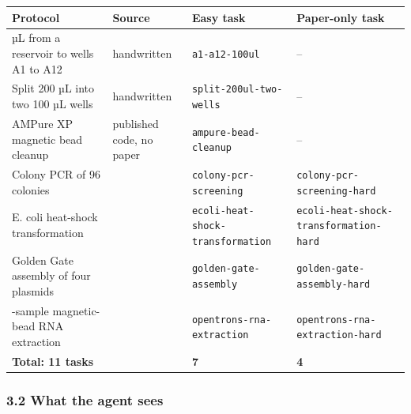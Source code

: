 \documentclass[
]{article}
\newcounter{none} %
\begin{document}
{\def\LTcaptype{none} %
\begin{longtable}[]{@{}
  >{\raggedright\arraybackslash}p{}
  >{\raggedright\arraybackslash}p{}
  >{\raggedright\arraybackslash}p{}
  >{\raggedright\arraybackslash}p{}@{}}
\toprule\noalign{}
\begin{minipage}[b]{\linewidth}\raggedright
Protocol
\end{minipage} & \begin{minipage}[b]{\linewidth}\raggedright
Source
\end{minipage} & \begin{minipage}[b]{\linewidth}\raggedright
Easy task
\end{minipage} & \begin{minipage}[b]{\linewidth}\raggedright
Paper-only task
\end{minipage} \\
\midrule\noalign{}
\endhead
\bottomrule\noalign{}
\endlastfoot
100 µL from a reservoir to wells A1 to A12 & handwritten &
\texttt{a1-a12-100ul} & -- \\
Split 200 µL into two 100 µL wells & handwritten &
\texttt{split-200ul-two-wells} & -- \\
AMPure XP magnetic bead cleanup & published code, no paper &
\texttt{ampure-bead-cleanup} & -- \\
Colony PCR of 96 colonies & \citep{malci2026slowpoke} &
\texttt{colony-pcr-screening} & \texttt{colony-pcr-screening-hard} \\
E. coli heat-shock transformation & \citep{kasprzyk2024apex} &
\texttt{ecoli-heat-shock-transformation} &
\texttt{ecoli-heat-shock-transformation-hard} \\
Golden Gate assembly of four plasmids & \citep{bryant2022assemblytron} &
\texttt{golden-gate-assembly} & \texttt{golden-gate-assembly-hard} \\
48-sample magnetic-bead RNA extraction & \citep{lazaroperona2021rna} &
\texttt{opentrons-rna-extraction} &
\texttt{opentrons-rna-extraction-hard} \\
\textbf{Total: 11 tasks} & & \textbf{7} & \textbf{4} \\
\end{longtable}
}

\subsubsection{3.2 What the agent sees}\label{what-the-agent-sees}
\end{document}
